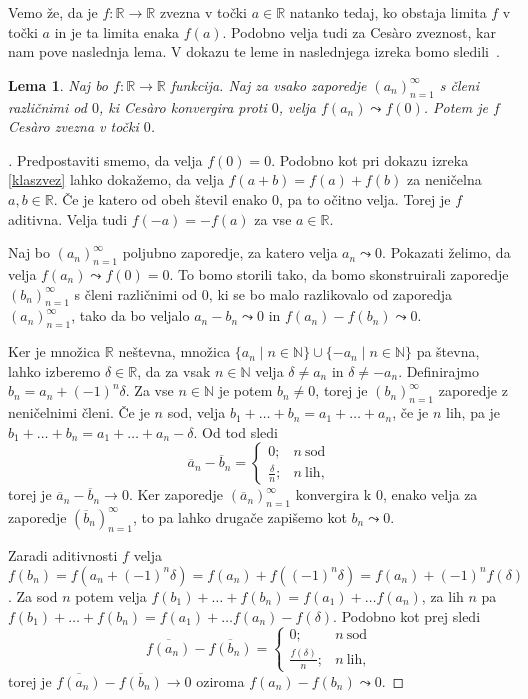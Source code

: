 \documentclass[a4paper,12pt]{article}
\def\N{\mathbb{N}}
\def\R{\mathbb{R}}
\theoremstyle{definition}
\theoremstyle{plain}
\newtheorem{lema}{Lema}
\newenvironment{dokaz}{\begin{proof}[\bfseries\upshape\proofname]}{\end{proof}}
\begin{document}
Vemo že, da je $f: \mathbb{R} \rightarrow \mathbb{R}$ zvezna v točki $a \in \mathbb{R}$ natanko tedaj, ko obstaja limita $f$ v točki $a$ in je ta limita enaka $f(a)$. Podobno velja tudi za Ces\`{a}ro zveznost, kar nam pove naslednja lema. V dokazu te leme in naslednjega izreka bomo sledili~\cite{1}.
\begin{lema}
    \label{lema}
    Naj bo $f: \mathbb{R} \rightarrow \mathbb{R}$ funkcija. Naj za vsako zaporedje $(a_n)_{n=1}^{\infty}$ s členi različnimi od $0$, ki Ces\`{a}ro konvergira proti $0$, velja $f(a_n) \leadsto f(0)$. Potem je $f$ Ces\`{a}ro zvezna v točki $0$.
\end{lema}
\begin{dokaz}
    Predpostaviti smemo, da velja $f(0) = 0$. Podobno kot pri dokazu izreka \ref{klaszvez} lahko dokažemo, da velja $f(a+b) = f(a) + f(b)$ za neničelna $a, b \in \mathbb{R}$. Če je katero od obeh števil enako $0$, pa to očitno velja. Torej je $f$ aditivna. Velja tudi $f(-a) = -f(a)$ za vse $a \in \R$.
    
    Naj bo $(a_n)_{n=1}^{\infty}$ poljubno zaporedje, za katero velja $a_n \leadsto 0$. Pokazati želimo, da velja $f(a_n) \leadsto f(0) = 0$. To bomo storili tako, da bomo skonstruirali zaporedje $(b_n)_{n=1}^{\infty}$ s členi različnimi od $0$, ki se bo malo razlikovalo od zaporedja $(a_n)_{n=1}^{\infty}$, tako da bo veljalo $a_n - b_n \leadsto 0$ in $f(a_n) - f(b_n) \leadsto 0$.

    Ker je množica $\R$ neštevna, množica $\{a_n \mid n \in \N\} \cup \{-a_n \mid n \in \N\}$ pa števna, lahko izberemo $\delta \in \R$, da za vsak $n \in \N$ velja $\delta \neq a_n$ in $\delta \neq -a_n$. Definirajmo $b_n = a_n + (-1)^n \delta$. Za vse $n \in \N$ je potem $b_n \neq 0$, torej je $(b_n)_{n=1}^{\infty}$ zaporedje z neničelnimi členi. Če je $n$ sod, velja $b_1 + \ldots + b_n = a_1 + \ldots + a_n$, če je $n$ lih, pa je $b_1 + \ldots + b_n = a_1 + \ldots + a_n - \delta$. Od tod sledi
    $$
    \overline{a}_n - \overline{b}_n = \begin{cases}
        0; & n \ \text{sod}\\
        \frac{\delta}{n}; & n \ \text{lih},
    \end{cases}
    $$
    torej je $\overline{a}_n - \overline{b}_n \rightarrow 0$. Ker zaporedje $(\overline{a}_n)_{n=1}^{\infty}$ konvergira k 0, enako velja za zaporedje $(\overline{b}_n)_{n=1}^{\infty}$, to pa lahko drugače zapišemo kot $b_n \leadsto 0$.

    Zaradi aditivnosti $f$ velja $f(b_n) = f(a_n + (-1)^n \delta) = f(a_n) + f((-1)^n \delta) = f(a_n) + (-1)^n f(\delta)$. Za sod $n$ potem velja $f(b_1) + \ldots + f(b_n) = f(a_1) + \ldots f(a_n)$, za lih $n$ pa $f(b_1) + \ldots + f(b_n) = f(a_1) + \ldots f(a_n) - f(\delta)$. Podobno kot prej sledi
    $$
    \overline{f(a_n)} - \overline{f(b_n)} = \begin{cases}
        0; & n \ \text{sod}\\
        \frac{f(\delta)}{n}; & n \ \text{lih},
    \end{cases}
    $$
    torej je $\overline{f(a_n)} - \overline{f(b_n)} \rightarrow 0$ oziroma $f(a_n) - f(b_n) \leadsto 0$.


\end{dokaz}
\end{document}

